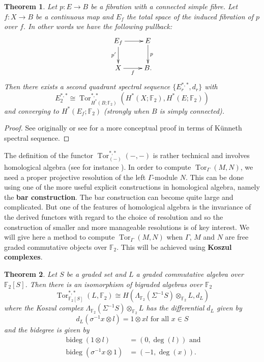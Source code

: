 \documentclass[11pt,a4paper]{amsart}
\theoremstyle{plain}
\newtheorem{thm}{Theorem}[section]
\theoremstyle{definition}
\theoremstyle{remark}
\DeclareMathOperator{\Tor}{Tor}
\DeclareMathOperator{\bideg}{bideg}
\newcommand{\F}{\mathbb{F}}
\begin{document}
\begin{thm}\label{t:EM}
Let $p:E\to B$ be a fibration with a connected simple fibre. Let $f:X\to B$ be a continuous map and $E_f$ the total space of the induced fibration of $p$ over $f$. In other words we have the following pullback:
$$\xymatrix{
E_f\ar[r]\ar[d]_{p'} &E\ar[d]^p\\
X\ar[r]_-f &B.
}$$ Then there exists a second quadrant spectral sequence $\{E_r^{*,*},d_r\}$ with
$$
E_2^{*,*}\cong\Tor_{H^*(B;\F_2)}^{*,*}(H^*(X;\F_2),H^*(E;\F_2))
$$ and converging to $H^*(E_f;\F_2)$ (strongly when $B$ is simply connected).
\end{thm}

\begin{proof}
See originally \cite{EM-66} or see \cite[Theorem 6.2, pp. 51-52]{Sm-70} for a more conceptual proof in terms of K\"unneth spectral sequence.
\end{proof}

The definition of the functor $\Tor_{(-)}^{*,*}(-,-)$ is rather technical and involves homological algebra (see for instance \cite[Definition 7.5, p. 240]{Mc-00}). In order to compute $\Tor_\Gamma(M,N)$, we need a proper projective resolution of the left $\Gamma$-module $N$. This can be done using one of the more useful explicit constructions in homological algebra, namely the {\bf bar construction}. The bar construction can become quite large and complicated. But one of the features of homological algebra is the invariance of the derived functors with regard to the choice of resolution and so the construction of smaller and more manageable resolutions is of key interest. We will give here a method to compute $\Tor_\Gamma(M,N)$ when $\Gamma$, $M$ and $N$ are free graded commutative objects over $\F_2$. This will be achieved using {\bf Koszul complexes}.

\begin{thm}
Let $S$ be a graded set and $L$ a graded commutative algebra over $\F_2[S]$. Then there is an isomorphism of bigraded algebras over $\F_2$
$$
\Tor^{*,*}_{\F_2[S]}(L,\F_2)\cong H(\Lambda_{\F_2}(\Sigma^{-1}S)\otimes_{\F_2}L,d_L)
$$ where the Koszul complex $\Lambda_{\F_2}(\Sigma^{-1}S)\otimes_{\F_2}L$ has the differential $d_L$ given by
$$
d_L(\sigma^{-1}x\otimes l)=1\otimes xl\text{ for all $x\in S$}
$$ and the bidegree is given by
\begin{align*}
\bideg(1\otimes l)&=(0,\deg(l))\text{ and}\\
\bideg(\sigma^{-1}x\otimes 1)&=(-1,\deg(x)).
\end{align*}
\end{thm}
\end{document}
